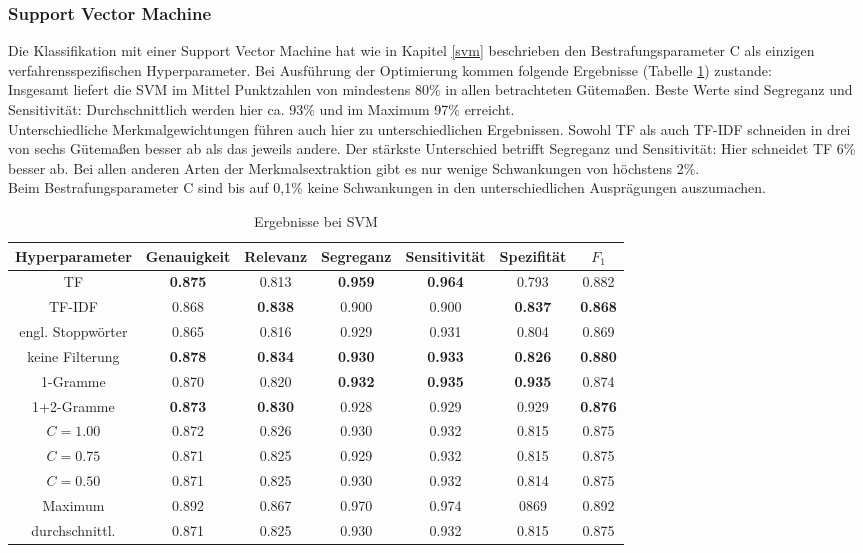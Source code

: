 \subsubsection{Support Vector Machine}
Die Klassifikation mit einer Support Vector Machine hat wie in Kapitel \ref{svm} beschrieben den Bestrafungsparameter C als einzigen verfahrensspezifischen Hyperparameter. Bei Ausführung der Optimierung kommen folgende Ergebnisse (Tabelle \ref{results-svm}) zustande:\\
Insgesamt liefert die SVM im Mittel Punktzahlen von mindestens 80\% in allen betrachteten Gütemaßen. Beste Werte sind Segreganz und Sensitivität: Durchschnittlich werden hier ca. 93\% und im Maximum 97\% erreicht.\\
Unterschiedliche Merkmalgewichtungen führen auch hier zu unterschiedlichen Ergebnissen. Sowohl TF als auch TF-IDF schneiden in drei von sechs Gütemaßen besser ab als das jeweils andere. Der stärkste Unterschied betrifft Segreganz und Sensitivität: Hier schneidet TF 6\% besser ab. Bei allen anderen Arten der Merkmalsextraktion gibt es nur wenige Schwankungen von höchstens 2\%.\\
Beim Bestrafungsparameter C sind bis auf 0,1\% keine Schwankungen in den unterschiedlichen Ausprägungen auszumachen.\\
\begin{table}[htb]
	\begin{center}
		\begin{tabular}{|c|c|c|c|c|c|c|}
			\hline 
			Hyperparameter & Genauigkeit & Relevanz & Segreganz & Sensitivität & Spezifität & $F_1$ \\ \hline \hline
			TF         & \textbf{0.875} & 0.813 & \textbf{0.959} & \textbf{0.964} & 0.793 & 0.882 \\ \hline
			TF-IDF     & 0.868 & \textbf{0.838} & 0.900 & 0.900 & \textbf{0.837} & \textbf{0.868} \\ \hline \hline
			engl. Stoppwörter  & 0.865 & 0.816 & 0.929 & 0.931 & 0.804 & 0.869 \\ \hline
			keine Filterung    & \textbf{0.878} & \textbf{0.834} & \textbf{0.930} & \textbf{0.933} & \textbf{0.826} & \textbf{0.880} \\ \hline \hline
			1-Gramme   & 0.870 & 0.820 & \textbf{0.932} & \textbf{0.935} & \textbf{0.935} & 0.874 \\ \hline
			1+2-Gramme  & \textbf{0.873} & \textbf{0.830} & 0.928 & 0.929 & 0.929 & \textbf{0.876} \\ \hline \hline
			$C=1.00$ & 0.872 & 0.826 & 0.930 & 0.932 & 0.815 & 0.875 \\ \hline 
			$C=0.75$ & 0.871 & 0.825 & 0.929 & 0.932 & 0.815 & 0.875 \\ \hline 
			$C=0.50$ & 0.871 & 0.825 & 0.930 & 0.932 & 0.814 & 0.875 \\ \hline
			\hline
			Maximum        & 0.892 & 0.867 & 0.970 & 0.974 & 0869 & 0.892 \\ \hline
			durchschnittl. & 0.871 & 0.825 & 0.930 & 0.932 & 0.815 & 0.875 \\ \hline
		\end{tabular}
		\caption{Ergebnisse bei SVM}\label{results-svm}
	\end{center}
\end{table}\\
